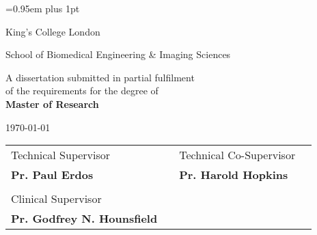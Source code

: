 \begin{titlepage}

\pagestyle{empty}


\vspace*{1.5cm}

\begin{center}
	{\LARGE{\theauthor}\par}
\end{center}
\vspace{0.6cm}
\begin{center}
        {\huge\baselineskip=0.95em plus 1pt \expandafter{
        \textbf{\thetitle}
        \par}}
\end{center}


\vspace{3cm}

\begin{center}
	\LARGE{\expandafter{\textrm{King's College London}}}\par
	\expandafter{\Large{School of Biomedical Engineering \& Imaging Sciences}\par}
\end{center}

\vspace{1.5cm}

\begin{center}
	A dissertation submitted in partial fulfilment 
	\\
	of the requirements for the degree of
	\\ 
	\textbf{Master of Research}	
\end{center}

\vspace{0.2cm}
\begin{center}
	\today
\end{center}

\vspace{1.0cm}

\begin{center}
\begin{tabular}{l p{3.3cm} l l}
	
Technical Supervisor & & Technical Co-Supervisor \\
\textbf{Pr. Paul Erdos} & & \textbf{Pr. Harold Hopkins}  \\
 & & \\
Clinical Supervisor & & \\
\textbf{Pr. Godfrey N. Hounsfield} & & 
	
\end{tabular}
\end{center}

\end{titlepage} 